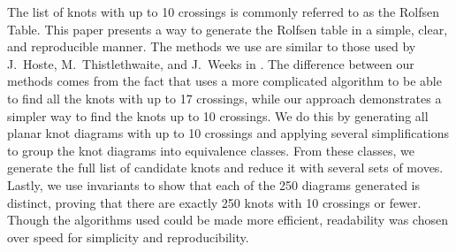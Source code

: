 
\diagrams
\singlecolumn

\begin{paperabs}
The list of knots with up to 10 crossings is commonly referred to as the Rolfsen
Table.
This paper presents a way to generate the Rolfsen table in a simple, clear, and
reproducible manner.
The methods we use are similar to those used by J.~Hoste, M.~Thistlethwaite, and
J.~Weeks in \cite{htw}.
The difference between our methods comes from the fact that \cite{htw} uses a
more complicated algorithm to be able to find all the knots with up to 17
crossings, while our approach demonstrates a simpler way to find the knots up to
10 crossings.
We do this by generating all planar knot diagrams with up to 10 crossings and
applying several simplifications to group the knot diagrams into equivalence
classes.
From these classes, we generate the full list of candidate knots and reduce it
with several sets of moves.
Lastly, we use invariants to show that each of the 250 diagrams generated is
distinct,  proving that there are exactly 250 knots with 10 crossings or fewer.
Though the algorithms used could be made more efficient, readability was chosen
over speed for simplicity and reproducibility.
\end{paperabs}
